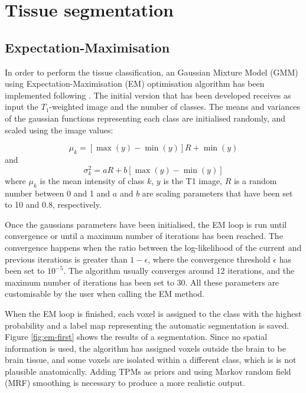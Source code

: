 \section{Tissue segmentation}


\subsection{Expectation-Maximisation}
In order to perform the tissue classification, an Gaussian Mixture Model (GMM) using Expectation-Maximisation (EM) optimisation algorithm has been implemented following \cite{leemput_automated_1999-1}. The initial version that has been developed receives as input the $T_1$-weighted image and the number of classes. The means and variances of the gaussian functions representing each class are initialised randomly, and scaled using the image values:

\begin{equation}
  \mu_k = [\max(y) - \min(y)] R + \min(y)
\end{equation}
and
\begin{equation}
  \sigma^2_k = a R + b [\max(y) - \min(y)]
\end{equation}
where $\mu_k$ is the mean intensity of class $k$, $y$ is the T1 image, $R$ is a random number between 0 and 1 and $a$ and $b$ are scaling parameters that have been set to 10 and 0.8, respectively.

Once the gaussians parameters have been initialised, the EM loop is run until convergence or until a maximum number of iterations has been reached. The convergence happens when the ratio between the log-likelihood of the current and previous iterations is greater than $1 - \epsilon$, where the convergence threshold $\epsilon$ has been set to $10^{-5}$. The algorithm usually converges around 12 iterations, and the maximum number of iterations has been set to 30. All these parameters are customisable by the user when calling the EM method.

When the EM loop is finished, each voxel is assigned to the class with the highest probability and a label map representing the automatic segmentation is saved. Figure \ref{fig:em-first} shows the results of a segmentation. Since no spatial information is used, the algorithm has assigned voxels outside the brain to be brain tissue, and some voxels are isolated within a different class, which is is not plausible anatomically. Adding TPMs as priors and using Markov random field (MRF) smoothing is necessary to produce a more realistic output.

